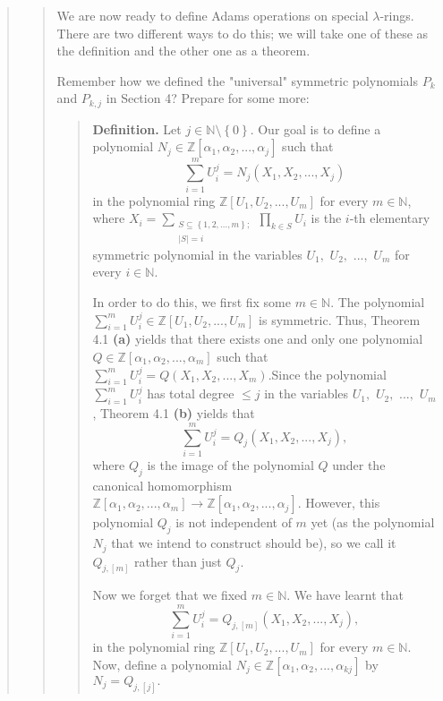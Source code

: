 \documentclass[12pt,final,notitlepage,onecolumn,german]{article}%
\begin{document}
\begin{quote}
\begin{quote}
We are now ready to define Adams operations on special $\lambda$-rings. There
are two different ways to do this; we will take one of these as the definition
and the other one as a theorem.

Remember how we defined the "universal" symmetric polynomials $P_{k}$ and
$P_{k,j}$ in Section 4? Prepare for some more:

\begin{quote}
\textbf{Definition.} Let $j\in\mathbb{N}\setminus\left\{  0\right\}  $. Our
goal is to define a polynomial $N_{j}\in\mathbb{Z}\left[  \alpha_{1}%
,\alpha_{2},...,\alpha_{j}\right]  $ such that%
\begin{equation}
\sum_{i=1}^{m}U_{i}^{j}=N_{j}\left(  X_{1},X_{2},...,X_{j}\right)  \label{Nj1}%
\end{equation}
in the polynomial ring $\mathbb{Z}\left[  U_{1},U_{2},...,U_{m}\right]  $ for
every $m\in\mathbb{N}$, where $X_{i}=\sum\limits_{\substack{S\subseteq\left\{
1,2,...,m\right\}  ;\\\left\vert S\right\vert =i}}\prod\limits_{k\in S}U_{i}$
is the $i$-th elementary symmetric polynomial in the variables $U_{1},$
$U_{2},$ $...,$ $U_{m}$ for every $i\in\mathbb{N}$.

In order to do this, we first fix some $m\in\mathbb{N}$. The polynomial
$\sum\limits_{i=1}^{m}U_{i}^{j}\in\mathbb{Z}\left[  U_{1},U_{2},...,U_{m}%
\right]  $ is symmetric. Thus, Theorem 4.1 \textbf{(a)} yields that there
exists one and only one polynomial $Q\in\mathbb{Z}\left[  \alpha_{1}%
,\alpha_{2},...,\alpha_{m}\right]  $ such that $\sum\limits_{i=1}^{m}U_{i}%
^{j}=Q\left(  X_{1},X_{2},...,X_{m}\right)  .$Since the polynomial
$\sum\limits_{i=1}^{m}U_{i}^{j}$ has total degree $\leq j$ in the variables
$U_{1},$ $U_{2},$ $...,$ $U_{m}$, Theorem 4.1 \textbf{(b)} yields that%
\[
\sum_{i=1}^{m}U_{i}^{j}=Q_{j}\left(  X_{1},X_{2},...,X_{j}\right)  ,
\]
where $Q_{j}$ is the image of the polynomial $Q$ under the canonical
homomorphism $\mathbb{Z}\left[  \alpha_{1},\alpha_{2},...,\alpha_{m}\right]
\rightarrow\mathbb{Z}\left[  \alpha_{1},\alpha_{2},...,\alpha_{j}\right]  $.
However, this polynomial $Q_{j}$ is not independent of $m$ yet (as the
polynomial $N_{j}$ that we intend to construct should be), so we call it
$Q_{j,\left[  m\right]  }$ rather than just $Q_{j}$.

Now we forget that we fixed $m\in\mathbb{N}$. We have learnt that%
\[
\sum_{i=1}^{m}U_{i}^{j}=Q_{j,\left[  m\right]  }\left(  X_{1},X_{2}%
,...,X_{j}\right)  ,
\]
in the polynomial ring $\mathbb{Z}\left[  U_{1},U_{2},...,U_{m}\right]  $ for
every $m\in\mathbb{N}$. Now, define a polynomial $N_{j}\in\mathbb{Z}\left[
\alpha_{1},\alpha_{2},...,\alpha_{kj}\right]  $ by $N_{j}=Q_{j,\left[
j\right]  }.$


\end{quote}
\end{quote}
\end{quote}
\end{document}
